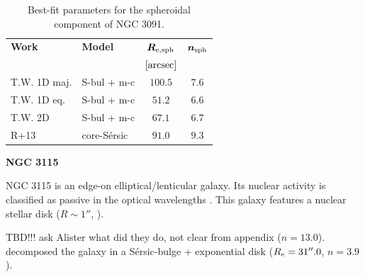 \documentclass[preprint2]{emulateapj}
\begin{document}
  \begin{table}[h]
  \small
  \caption{Best-fit parameters for the spheroidal component of NGC 3091.}
  \begin{center}
  \begin{tabular}{llcc}
  \hline
  {\bf Work} & {\bf Model}   & $\bm R_{\rm e,sph}$    & $\bm n_{\rm sph}$ \\
    &  &  $[\rm arcsec]$ & \\
  \hline
  T.W. 1D maj. & S-bul + m-c & $100.5$  &  $7.6$ \\
  T.W. 1D eq.  & S-bul + m-c & $51.2$	&  $6.6$ \\
  T.W. 2D      & S-bul + m-c & $67.1$	&  $6.7$ \\
  \hline
  R+13         & core-S\'ersic & $91.0$  &  $9.3$ \\
  \hline
  \end{tabular}
  \end{center}
  \label{tab:n3091}
  \end{table}


  \clearpage\newpage\noindent
  {\bf NGC 3115 \\}

  NGC 3115 is an edge-on elliptical/lenticular galaxy. 
  Its nuclear activity is classified as passive in the optical wavelengths \citep{gavazzi2013nuclspec}.
  This galaxy features a nuclear stellar disk ($R \sim 1''$, \citealt{scorzabender1995,ledo2010}).

  \cite{grahamdriver2007} TBD!!! ask Alister what did they do, not clear from appendix
  ($n = 13.0$). 
  \cite{fisherdrory2008} decomposed the galaxy in a S\'ersic-bulge + exponential disk 
  ($R_{\rm e} = 31''.0$, $n = 3.9$). 
\end{document}
